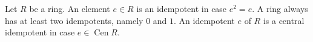 Let $R$ be a ring. An element $e \in R$ is an idempotent in case $e^2 = e$. A ring always has at least two idempotents, namely $0$ and $1$. An idempotent $e$ of $R$ is a central idempotent in case $e \in \operatorname{Cen} R$.
